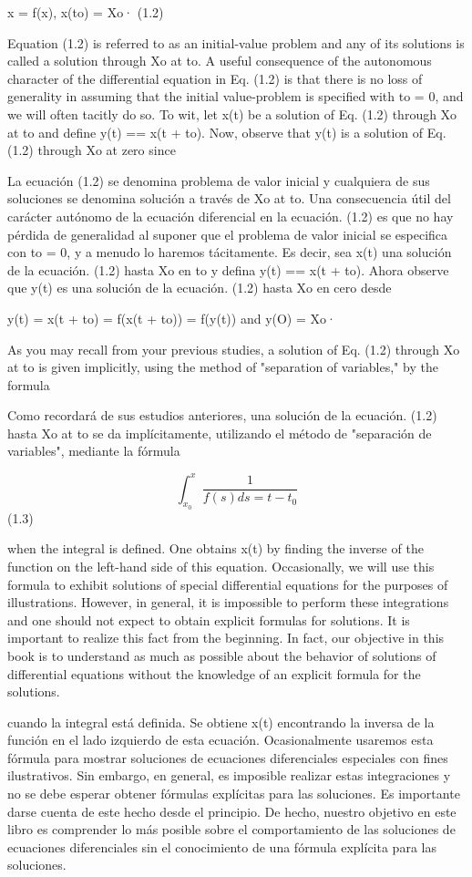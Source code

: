 \documentclass[]{article}
\begin{document}
x = f(x), x(to) = Xo· (1.2)

Equation (1.2) is referred to as an initial-value problem and any of its solutions is called a solution through Xo at to. A useful consequence of the autonomous character of the differential equation in Eq. (1.2) is that there is no loss of generality in assuming that the initial value-problem is specified with to = 0, and we will often tacitly do so. To wit, let x(t) be a solution of Eq. (1.2) through Xo at to and define y(t) == x(t + to). Now, observe that y(t) is a solution of Eq. (1.2) through Xo at zero since

La ecuación (1.2) se denomina problema de valor inicial y cualquiera de sus soluciones se denomina solución a través de Xo at to. Una consecuencia útil del carácter autónomo de la ecuación diferencial en la ecuación. (1.2) es que no hay pérdida de generalidad al suponer que el problema de valor inicial se especifica con to = 0, y a menudo lo haremos tácitamente. Es decir, sea x(t) una solución de la ecuación. (1.2) hasta Xo en to y defina y(t) == x(t + to). Ahora observe que y(t) es una solución de la ecuación. (1.2) hasta Xo en cero desde

y(t) = x(t + to) = f(x(t + to)) = f(y(t)) and y(O) = Xo·

As you may recall from your previous studies, a solution of Eq. (1.2) through Xo at to is given implicitly, using the method of "separation of variables," by the formula

Como recordará de sus estudios anteriores, una solución de la ecuación. (1.2) hasta Xo at to se da implícitamente, utilizando el método de "separación de variables", mediante la fórmula

$$
\int_{x_0}^x \frac{1}{f(s) ds = t - t_0}
$$
(1.3)


when the integral is defined. One obtains x(t) by finding the inverse of the function on the left-hand side of this equation. Occasionally, we will use this formula to exhibit solutions of special differential equations for the purposes of illustrations. However, in general, it is impossible to perform these integrations and one should not expect to obtain explicit formulas for solutions. It is important to realize this fact from the beginning. In fact, our objective in this book is to understand as much as possible about the behavior of solutions of differential equations without the knowledge of an explicit formula for the solutions.

cuando la integral está definida. Se obtiene x(t) encontrando la inversa de la función en el lado izquierdo de esta ecuación. Ocasionalmente usaremos esta fórmula para mostrar soluciones de ecuaciones diferenciales especiales con fines ilustrativos. Sin embargo, en general, es imposible realizar estas integraciones y no se debe esperar obtener fórmulas explícitas para las soluciones. Es importante darse cuenta de este hecho desde el principio. De hecho, nuestro objetivo en este libro es comprender lo más posible sobre el comportamiento de las soluciones de ecuaciones diferenciales sin el conocimiento de una fórmula explícita para las soluciones.
\end{document}
